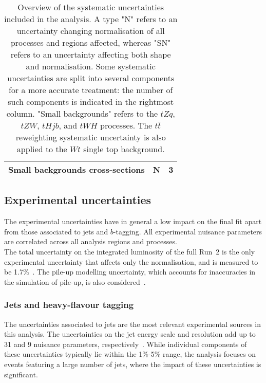 \begin{table}[htbp]
\begin{tabular}{lcc}
  \hspace{2ex}Small backgrounds cross-sections	&   N  &  3  \\
  \bottomrule
  \bottomrule
  \end{tabular}
  \caption{
  Overview of the systematic uncertainties included in the analysis.
  A type "N" refers to an uncertainty changing normalisation of all processes and regions affected,  whereas "SN" refers to an uncertainty affecting both shape and normalisation. Some systematic uncertainties are split into several components for a more accurate treatment:  the number of such components is indicated in the rightmost column.
  "Small backgrounds" refers to the $tZq$, $tZW$, %
  $tHjb$, and $tWH$ processes. The $t\bar t$ reweighting systematic uncertainty is also applied to the $Wt$ single top background.
  }
  \label{Hplustb:tablesys}
\end{table}

\subsection{Experimental uncertainties}
\label{Hplustb:SectionExperimentalUnc}
The experimental uncertainties have in general a low impact on the final fit apart from those associated to jets and $b$-tagging. All experimental nuisance parameters are correlated across all analysis regions and processes.\\

The total uncertainty on the integrated luminosity of the full Run~2 is the only experimental uncertainty that affects only the normalisation, and is measured to be 1.7\%~\cite{luminosity}. The pile-up modelling uncertainty, which accounts for inaccuracies in the simulation of pile-up, is also considered~\cite{PhysRevLett.117.182002}.

\subsubsection{Jets and heavy-flavour tagging}
The uncertainties associated to jets are the most relevant experimental sources in this analysis. The uncertainties on the jet energy scale and resolution add up to 31 and 9 nuisance parameters, respectively~\cite{ATLAS_Collaboration2020-ip,Aaboud_2020}. While individual components of these uncertainties typically lie within the 1\%-5\% range, the analysis focuses on events featuring a large number of jets, where the impact of these uncertainties is significant.\\

